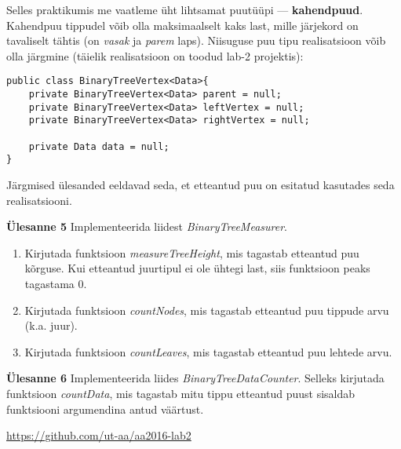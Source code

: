 \documentclass[a4paper]{article}
\begin{document}
Selles praktikumis me vaatleme üht lihtsamat puutüüpi --- \textbf{kahendpuud}. Kahendpuu tippudel võib olla maksimaalselt kaks last, mille järjekord on tavaliselt tähtis (on \emph{vasak} ja \emph{parem} laps). Niisuguse puu tipu realisatsioon võib olla järgmine (täielik realisatsioon on toodud lab-2 projektis):

\begin{lstlisting}
public class BinaryTreeVertex<Data>{
	private BinaryTreeVertex<Data> parent = null;
	private BinaryTreeVertex<Data> leftVertex = null;
	private BinaryTreeVertex<Data> rightVertex = null;
	
	private Data data = null;
}
\end{lstlisting}

Järgmised ülesanded eeldavad seda, et etteantud puu on esitatud kasutades seda realisatsiooni.

\begin{problem}
\textbf{Ülesanne 5}
\newline
Implementeerida liidest \textit{BinaryTreeMeasurer}.
\begin{enumerate}
\item
Kirjutada funktsioon \textit{measureTreeHeight}, mis tagastab etteantud puu kõrguse.
Kui etteantud juurtipul ei ole ühtegi last, siis funktsioon peaks tagastama 0.
\item
Kirjutada funktsioon \textit{countNodes}, mis tagastab etteantud puu tippude arvu (k.a. juur).
\item
Kirjutada funktsioon \textit{countLeaves}, mis tagastab etteantud puu lehtede arvu.
\end{enumerate}
\end{problem}

\begin{problem}
\textbf{Ülesanne 6}
\newline
Implementeerida liides \textit{BinaryTreeDataCounter}. Selleks kirjutada funktsioon \textit{countData}, mis tagastab mitu tippu etteantud puust sisaldab funktsiooni argumendina antud väärtust.
\end{problem}

\url{https://github.com/ut-aa/aa2016-lab2}
\end{document}
